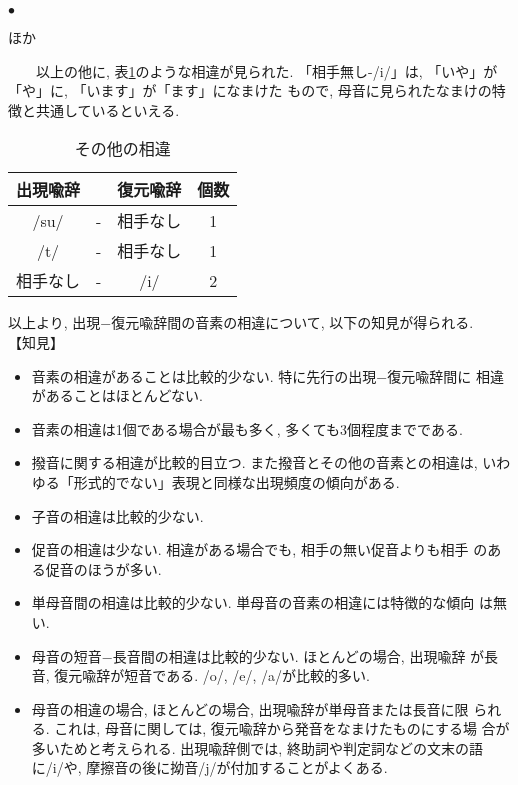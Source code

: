 \begin{list}{\Large $\bullet$}{}
\item ほか

\ \ \ \ 以上の他に, 表\ref{different10}のような相違が見られた. 
「相手無し-/i/」は, 「いや」が「や」に, 「います」が「ます」になまけた
もので, 母音に見られたなまけの特徴と共通しているといえる.

\begin{table}
\begin{center}
\caption{その他の相違}\label{different10}
\begin{tabular}{cccc}
出現喩辞 && 復元喩辞 & 個数\\\hline
/su/ & - & 相手なし & 1\\
/t/ & - & 相手なし & 1\\
相手なし & - & /i/ & 2\\
\end{tabular}
\end{center}
\end{table}

\end{list}

以上より, 出現−復元喩辞間の音素の相違について, 以下の知見が得られる. 
\vspace*{2em}\\
\vspace{-0.2mm} 
【知見】
\begin{itemize}
\item 音素の相違があることは比較的少ない. 特に先行の出現−復元喩辞間に
相違があることはほとんどない. 
\item 音素の相違は1個である場合が最も多く, 多くても3個程度までである. 
\item 撥音に関する相違が比較的目立つ. また撥音とその他の音素との相違は, 
いわゆる「形式的でない」表現と同様な出現頻度の傾向がある. 
\item 子音の相違は比較的少ない. 
\item 促音の相違は少ない. 相違がある場合でも, 相手の無い促音よりも相手
のある促音のほうが多い.   
\item 単母音間の相違は比較的少ない. 単母音の音素の相違には特徴的な傾向
は無い.  
\item 母音の短音−長音間の相違は比較的少ない. ほとんどの場合, 出現喩辞
が長音, 復元喩辞が短音である. /o/, /e/, /a/が比較的多い. 
\item 母音の相違の場合, ほとんどの場合, 出現喩辞が単母音または長音に限
られる. これは, 母音に関しては, 復元喩辞から発音をなまけたものにする場
合が多いためと考えられる. 出現喩辞側では, 終助詞や判定詞などの文末の語
に/i/や, 摩擦音の後に拗音/j/が付加することがよくある. 
\end{itemize}

